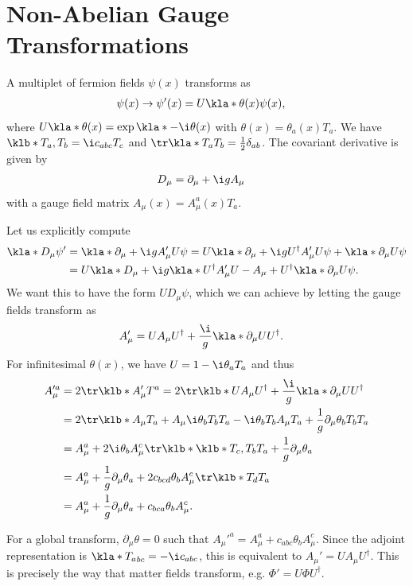 \documentclass[english, parskip=full]{scrbook}
\newcommand{\example}[3]{\begin{tcolorbox}[colback=colorbackgroundexample,colframe=colorexample, breakable,enhanced,title={\textbf{#1}: #2.}]#3\end{tcolorbox}}
\begin{document}
\section{Non-Abelian Gauge Transformations}
A multiplet of fermion fields $\psi(x)$ transforms as
\begin{align}
\psi(x) &\rightarrow\psi'(x)=U\kla*{\theta(x)} \psi(x),
\end{align}
where $U\kla*{\theta(x)}=\exp\kla*{-\i\theta(x)}$ with $\theta(x)=\theta_a(x)T_a$.
We have $\klb*{T_a,T_b}=\i c_{abc}T_c$ and $\tr\kla*{T_aT_b}=\frac{1}{2}\delta_{ab}$.
The covariant derivative is given by
\begin{align}
D_\mu &= \partial_\mu + \i gA_\mu
\end{align}
with a gauge field matrix $A_\mu(x)=A_\mu^a(x)T_a$.
\example{Gauge Transform}{Multiplet Fermion Fields}{
Let us explicitly compute
\begin{align}
\kla*{D_\mu \psi}' &= \kla*{\partial_\mu + \i gA_\mu'} U\psi = U\kla*{\partial_\mu + \i g U^\dagger A_\mu' U}\psi + \kla*{\partial_\mu U}\psi\\
&= U \kla*{D_\mu + \i g \kla*{U^\dagger A_\mu' U - A_\mu } + U^\dagger \kla*{\partial_\mu U}}\psi.
\end{align}
We want this to have the form $UD_\mu\psi$, which we can achieve by letting the gauge fields transform as
\begin{align}
A_\mu' &= U A_\mu U^\dagger + \frac{\i}{g} \kla*{\partial_\mu U} U^\dagger.
\end{align}
For infinitesimal $\theta(x)$, we have $U = 1 -\i\theta_aT_a$ and thus
\begin{align}
A_\mu'^a &= 2\tr\klb*{A_\mu' T^a} = 2\tr\klb*{UA_\mu U^\dagger + \frac{\i}{g} \kla*{\partial_\mu U}U^\dagger}\\
&= 2\tr\klb*{A_\mu T_a + A_\mu \i \theta_bT_b T_a - \i\theta_bT_b A_\mu T_a + \frac{1}{g} \partial_\mu \theta_bT_b T_a}\\
&= A_\mu^a + 2\i\theta_b A_\mu^c\tr\klb*{\klb*{T_c,T_b} T_a} + \frac{1}{g} \partial_\mu \theta_a\\
&= A_\mu^a + \frac{1}{g} \partial_\mu \theta_a + 2c_{bcd} \theta_b A_\mu^c\tr\klb*{T_d T_a}\\
&= A_\mu^a + \frac{1}{g} \partial_\mu \theta_a + c_{bca} \theta_b A_\mu^c.
\end{align}
}
For a global transform, $\partial_\mu\theta=0$ such that $A_\mu'^a=A_\mu^a + c_{abc}\theta_bA_\mu^c$.
Since the adjoint representation is $\kla*{T_a}_{bc}=-\i c_{abc}$, this is equivalent to $A_\mu'=UA_\mu U^\dagger$.
This is precisely the way that matter fields transform, e.g. $\Phi'=U\Phi U^\dagger$.
\end{document}
